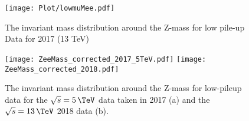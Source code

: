 \begin{figure}[H]
	\center
	\texttt{[image: Plot/lowmuMee.pdf]}
	\caption{The invariant mass distribution around the Z-mass for low pile-up Data for 2017 (13 TeV)}
	\label{fig:mee-lowmu-data-vs-MC}
\end{figure}
\begin{figure}[H]
\begin{center}
    {{\texttt{[image: ZeeMass\_corrected\_2017\_5TeV.pdf]}
    }}
    {{\texttt{[image: ZeeMass\_corrected\_2018.pdf]}
    }}
    \caption{ The invariant mass distribution around the Z-mass for low-pileup data for the $\sqrt{s}=5\,\TeV$ data taken in 2017 (a) and the $\sqrt{s}=13\,\TeV$ 2018 data (b).}
    \label{fig:alpha-highmu-lowmu-thresh-corr}
\end{center}
\end{figure}

\clearpage
	
